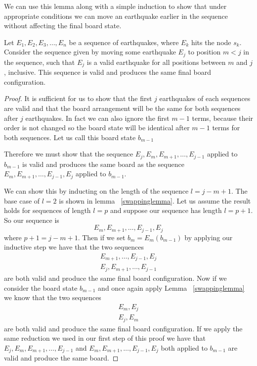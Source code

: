 \documentclass[runningheads,a4paper]{llncs}
\begin{document}
We can use this lemma along with a simple induction to show that under appropriate conditions we can move an earthquake earlier in the sequence without affecting the final board state.
\begin{lemma}
Let $E_1,E_2,E_3,\dots, E_n$ be a sequence of earthquakes, where $E_k$ hits the node $s_k$. Consider  the sequence given by moving some earthquake $E_j$ to position $m<j$ in the sequence, such that $E_j$ is a valid earthquake for all positions between $m$ and $j$, inclusive. 
This sequence is valid and produces the same final board configuration.
\end{lemma}
\label{shiftlemma}
\begin{proof}
It is sufficient for us to show that the first $j$ earthquakes of each sequences are valid and that the board arrangement will be the same for both sequences after $j$ earthquakes. In fact we can also ignore the first $m-1$ terms, because their order is not changed so the board state will be identical after $m-1$ terms for both sequences. Let us call this board state $b_{m-1}$

Therefore we must show that the sequence $E_j, E_m, E_{m+1}, \ldots, E_{j-1}$ applied to $b_{m-1}$ is valid and produces the same board as the sequence $E_m, E_{m+1}, \ldots, E_{j-1}, E_j$ applied to $b_{m-1}$. 

We can show this by inducting on the length of the sequence $l=j-m+1$. The base case of $l=2$ is shown in lemma ~\ref{swappinglemma}. Let us assume the result holds for sequences of length $l=p$ and suppose our sequence has length $l=p+1$. So our sequence is 
\begin{equation*}
E_m, E_{m+1}, \ldots, E_{j-1}, E_j
\end{equation*}
where $p+1=j-m+1$. Then if we set $b_{m} = E_{m} (b_{m-1})$ by applying our inductive step we have that the two sequences 
\begin{align*}
E_{m+1}, \ldots, E_{j-1}, E_{j} \\ 
E_{j}, E_{m+1}, \ldots,  E_{j-1} 
\end{align*}
are both valid and produce the same final board configuration. Now if we consider the board state $b_{m-1}$ and once again apply Lemma ~\ref{swappinglemma} we know that the two sequences 
\begin{align*}
E_{m}, E_{j} \\
E_{j}, E_{m}
\end{align*}
are both valid and produce the same final board configuration. If we apply the same reduction we used in our first step of this proof we have  that $E_j, E_m, E_{m+1}, \ldots, E_{j-1}$  and $E_m, E_{m+1}, \ldots, E_{j-1}, E_j$ both applied to $b_{m-1}$ are valid and produce the same board. 
\end{proof}
\end{document}
